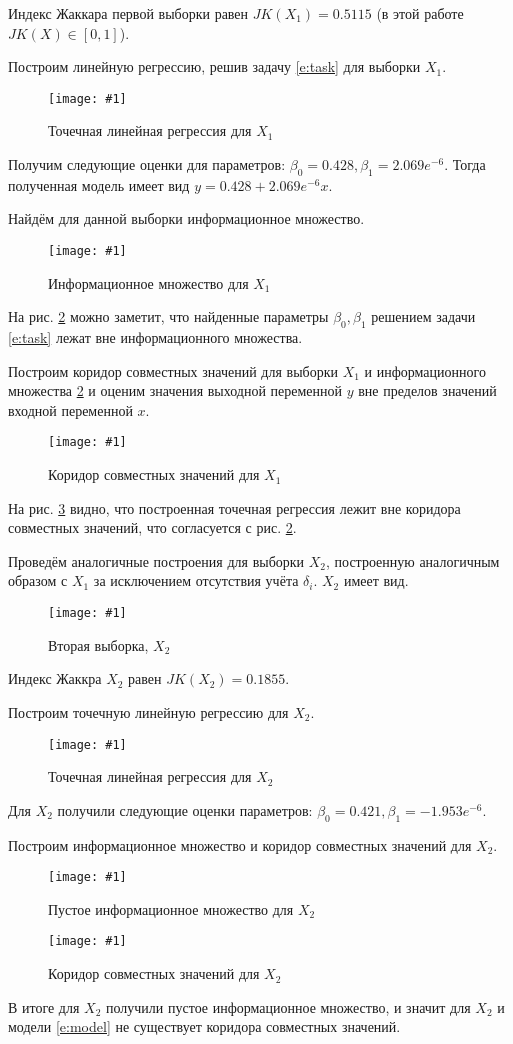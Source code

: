 \documentclass[a4paper,12pt]{article}
\newcommand{\plot}[3]{
    \begin{figure}[H]
        \begin{center}
            \texttt{[image: \#1]}
            \caption{#2}
            \label{#3}
        \end{center}
    \end{figure}
}
\begin{document}
    Индекс Жаккара первой выборки равен $ JK(X_1) = 0.5115 $ (в этой работе $ JK(X) \in [0, 1] $).

    Построим линейную регрессию, решив задачу \ref{e:task} для выборки $ X_1 $.
    \plot{PointRegressionX1}{Точечная линейная регрессия для $ X_1 $}{p:regressionX1}
    
    Получим следующие оценки для параметров: $ \beta_0 = 0.428, \beta_1 = 2.069e^{-6} $.
    Тогда полученная модель имеет вид $ y = 0.428 + 2.069e^{-6} x $.

    Найдём для данной выборки информационное множество.
    \plot{InformSetX1}{Информационное множество для $ X_1 $}{p:informSetX1}

    На рис. \ref{p:informSetX1} можно заметит, что найденные параметры
    $ \beta_0, \beta_1 $ решением задачи \ref{e:task} лежат вне информационного множества.

    Построим коридор совместных значений для выборки $ X_1 $ и информационного множества \ref{p:informSetX1}
    и оценим значения выходной переменной $ y $ вне пределов значений входной переменной $ x $.
    \plot{InformSetCorridorX1}{Коридор совместных значений для $ X_1 $}{p:informSetCorridorX1}

    На рис. \ref{p:informSetCorridorX1} видно, что построенная точечная регрессия лежит вне коридора совместных значений,
    что согласуется с рис. \ref{p:informSetX1}.

    Проведём аналогичные построения для выборки $ X_2 $, построенную аналогичным образом с $ X_1 $
    за исключением отсутствия учёта $ \delta_i $. $ X_2 $ имеет вид.
    \plot{X2}{Вторая выборка, $ X_2 $}{p:sampleX2}
    
    Индекс Жаккра $ X_2 $ равен $ JK(X_2) = 0.1855 $.

    Построим точечную линейную регрессию для $ X_2 $.
    \plot{PointRegressionX2}{Точечная линейная регрессия для $ X_2 $}{p:regressionX2}

    Для $ X_2 $ получили следующие оценки параметров: $ \beta_0 = 0.421, \beta_1 = -1.953e^{-6} $.

    Построим информационное множество и коридор совместных значений для $ X_2 $.

    \plot{InformSetX2}{Пустое информационное множество для $ X_2 $}{p:informSetX2}
    \plot{InformSetCorridorX2}{Коридор совместных значений для $ X_2 $}{p:informSetCorridorX2}

    В итоге для $ X_2 $ получили пустое информационное множество,
    и значит для $ X_2 $ и модели \ref{e:model} не существует коридора совместных значений.
\end{document}
